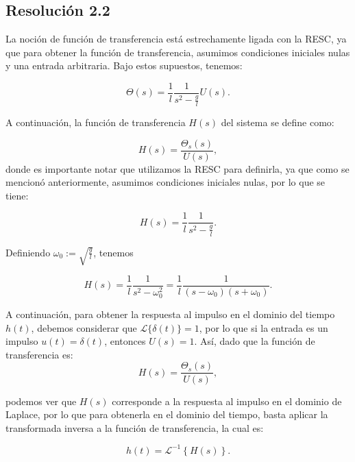 \documentclass[
  11pt,
  letterpaper,
   addpoints,
   answers
  ]{exam}
\begin{document}
\begin{questions}
\begin{solution}
\subsection*{Resolución 2.2}
La noción de función de transferencia está estrechamente ligada con la RESC, ya que para obtener la función de transferencia, asumimos condiciones iniciales nulas y una entrada arbitraria. Bajo estos supuestos, tenemos:

\begin{equation}
\Theta(s) = \frac{1}{l} \frac{1}{s^2 - \frac{g}{l}} U(s).
\end{equation}

A continuación, la función de transferencia \(H(s)\) del sistema se define como:

\begin{equation}
H(s) = \frac{\Theta_s(s)}{U(s)},
\end{equation}
donde es importante notar que utilizamos la RESC para definirla, ya que como se mencionó anteriormente, asumimos condiciones iniciales nulas, por lo que se tiene:

\begin{equation}
H(s) = \frac{1}{l} \frac{1}{s^2 - \frac{g}{l}}.
\end{equation}

Definiendo \(\omega_0 := \sqrt{\frac{g}{l}}\), tenemos

\begin{equation}
H(s) = \frac{1}{l} \frac{1}{s^2 - \omega_0^2} = \frac{1}{l} \frac{1}{(s - \omega_0)(s + \omega_0)}.
\end{equation}

A continuación, para obtener la respuesta al impulso en el dominio del tiempo \(h(t)\), debemos considerar que \(\mathcal{L}\{\delta(t)\} = 1\), por lo que si la entrada es un impulso \(u(t) = \delta(t)\), entonces \(U(s) = 1\). Así, dado que la función de transferencia es:
\begin{equation}
H(s) = \frac{\Theta_s(s)}{U(s)},
\end{equation}

podemos ver que \(H(s)\) corresponde a la respuesta al impulso en el dominio de Laplace, por lo que para obtenerla en el dominio del tiempo, basta aplicar la transformada inversa a la función de transferencia, la cual es:

\begin{equation}
h(t) = \mathcal{L}^{-1}\left\{ H(s) \right\}.
\end{equation}


\end{solution}
\end{questions}
\end{document}
